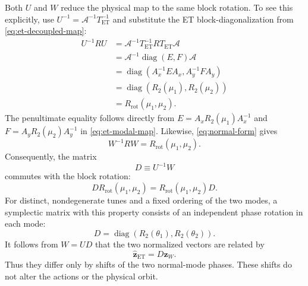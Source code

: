 \documentclass[11pt,a4paper]{article}
\newcommand{\diag}{\operatorname{diag}}
\newcommand{\mat}[1]{\bm{#1}}
\begin{document}
Both $U$ and $W$ reduce the physical map to the same block rotation.  To see
this explicitly, use $U^{-1}=\mathcal A^{-1}T_{\mathrm{ET}}^{-1}$ and substitute
the ET block-diagonalization from \cref{eq:et-decoupled-map}:
\begin{align}
 U^{-1}RU
 &=\mathcal A^{-1}T_{\mathrm{ET}}^{-1}
   RT_{\mathrm{ET}}\mathcal A
 \nonumber\\
 &=\mathcal A^{-1}\diag(E,F)\mathcal A
 \nonumber\\
 &=\diag(A_x^{-1}EA_x,A_y^{-1}FA_y)
 \nonumber\\
 &=\diag(R_2(\mu_1),R_2(\mu_2))
 \nonumber\\
 &=R_{\mathrm{rot}}(\mu_1,\mu_2).
 \label{eq:U-normalizes-R}
\end{align}
The penultimate equality follows directly from
$E=A_xR_2(\mu_1)A_x^{-1}$ and $F=A_yR_2(\mu_2)A_y^{-1}$ in
\cref{eq:et-modal-map}.
Likewise, \cref{eq:normal-form} gives
\begin{equation}
 W^{-1}RW=R_{\mathrm{rot}}(\mu_1,\mu_2).
\end{equation}
Consequently, the matrix
\begin{equation}
 D\equiv U^{-1}W
 \label{eq:D-definition}
\end{equation}
commutes with the block rotation:
\begin{equation}
 DR_{\mathrm{rot}}(\mu_1,\mu_2)
 =R_{\mathrm{rot}}(\mu_1,\mu_2)D.
\end{equation}
For distinct, nondegenerate tunes and a fixed ordering of the two modes, a
symplectic matrix with this property consists of an independent phase rotation
in each mode:
\begin{equation}
 D=\diag\!\left(R_2(\theta_1),R_2(\theta_2)\right).
 \label{eq:D-phase-rotations}
\end{equation}
It follows from $W=UD$ that the two normalized vectors are related by
\begin{equation}
 \widehat{\mat z}_{\mathrm{ET}}=D\widehat{\mat z}_W.
 \label{eq:normalized-coordinate-gauges}
\end{equation}
Thus they differ only by shifts of the two normal-mode phases.  These shifts
do not alter the actions or the physical orbit.
\end{document}
